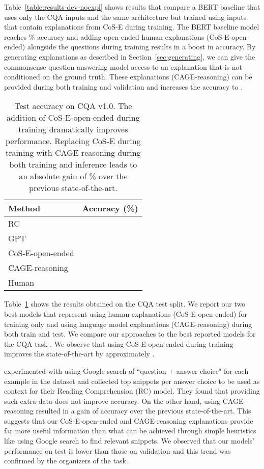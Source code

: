 \documentclass[11pt,a4paper]{article}
\begin{document}
Table~\ref{table:results-dev-noexpl} shows results that compare a BERT baseline that uses only the CQA inputs and the same architecture but trained using inputs that contain explanations from CoS-E during training. 
The BERT baseline model reaches \% accuracy and adding open-ended human explanations (CoS-E-open-ended) alongside the questions during training results in a  boost in accuracy. 
By generating explanations as described in Section~\ref{sec:generating},
we can give the commonsense question answering model access to an explanation that is not conditioned on the ground truth.
These explanations (CAGE-reasoning) can be provided during both training and validation and increases the accuracy to .



\begin{table}[!t]
\centering
\small
\begin{tabular}{lc}
\toprule
\textbf{Method}&\textbf{Accuracy (\%)}\\
\midrule
RC \citep{talmor2018commonsenseqa}& \\
GPT \citep{talmor2018commonsenseqa} & \\
CoS-E-open-ended &\\
CAGE-reasoning  &\\
Human  \citep{talmor2018commonsenseqa}& \\
\bottomrule
\end{tabular}
\caption{Test accuracy on CQA v1.0. The addition of CoS-E-open-ended during training dramatically improves performance. Replacing CoS-E during training with CAGE reasoning during both training and inference leads to an absolute gain of \% over the previous state-of-the-art.}
\vspace{-0.25cm}
\label{table:results-test}
\end{table}

Table~\ref{table:results-test} shows the results obtained on the CQA test split. 
We report our two best models that represent using human explanations (CoS-E-open-ended) for training only and using language model explanations (CAGE-reasoning) during both train and test. 
We compare our approaches to the best reported models for the CQA task \citep{talmor2018commonsenseqa}. 
We observe that using CoS-E-open-ended during training improves the state-of-the-art by approximately . 

\citet{talmor2018commonsenseqa} experimented with using Google search of ``question + answer choice"  for each example in the dataset and collected  top snippets per answer choice to be used as context for their Reading Comprehension (RC) model. 
They found that providing such extra data does not improve accuracy. 
On the other hand, using CAGE-reasoning resulted in a gain of  accuracy over the previous state-of-the-art.
This suggests that our CoS-E-open-ended and CAGE-reasoning explanations provide far more useful information than what can be achieved through simple heuristics like using Google search to find relevant snippets. We observed
that our models' performance on test is lower
than those on validation and this trend was confirmed by the organizers
of the task.
\end{document}

